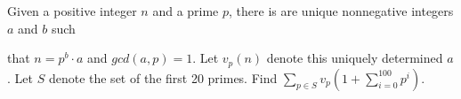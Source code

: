 Given a positive integer $n$ and a prime $p$, there is are unique nonnegative integers $a$ and $b$ such

that $n = p^b \cdot  a$ and $gcd  (a, p) = 1$. Let $v_p(n)$ denote this uniquely determined $a$. Let $S$ denote the set of the first 20 primes. Find $\sum_{ p \in S} v_p (1 + \sum^{100}_{i=0} p^i )$.
